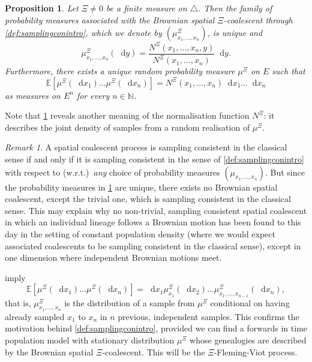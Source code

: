 \documentclass[reqno,draft]{amsart}
\numberwithin{equation}{section}
\theoremstyle{plain}
\newtheorem{proposition}[theorem]{Proposition}
\theoremstyle{remark}
\newtheorem{remark}[theorem]{Remark}
\newcommand{\N}{\mathbb{N}} %
\newcommand{\E}{\mathbb{E}} %
\newcommand*\diff{\mathop{}\!\mathrm{d}}
\begin{document}
\begin{proposition}\label{prop:musamplingintro}
    Let $\Xi \neq 0$ be a finite measure on $\triangle$. Then the family of probability measures associated with the Brownian spatial $\Xi$-coalescent through \cref{def:samplingconintro}, which we denote by $(\mu^\Xi_{x_1, \ldots ,x_n})$, is unique and
    \begin{equation}\label{eq:muNintro}
        \mu^{\Xi}_{x_1, \ldots ,x_n}(\diff y) = \frac{N^\Xi(x_1,\ldots ,x_n,y)}{N^\Xi(x_1, \ldots ,x_n)} \diff y.
    \end{equation}
    Furthermore, there exists a unique random probability measure $\mu^\Xi$ on $E$ such that
    \begin{equation}\label{eq:Emuintro}
        \E\left[ \mu^\Xi(\diff x_1) \ldots \mu^\Xi(\diff x_n)\right] = N^\Xi(x_1, \ldots ,x_n) \diff x_1\ldots \diff x_n
    \end{equation}
    as measures on $E^n$ for every $n\in \N$.
\end{proposition}
Note that \cref{prop:musamplingintro} reveals another meaning of the normalisation function $N^\Xi$: it describes the joint density of samples from a random realisation of $\mu^\Xi$.

\begin{remark}
    A spatial coalescent process is sampling consistent in the classical sense if and only if it is sampling consistent in the sense of \cref{def:samplingconintro} with respect to (w.r.t.)\ \emph{any} choice of probability measures $(\mu_{x_1, \ldots ,x_n})$. But since the probability measures in \cref{prop:musamplingintro} are unique, there exists no Brownian spatial coalescent, except the trivial one, which is sampling consistent in the classical sense. This may explain why no non-trivial, sampling consistent spatial coalescent in which an individual lineage follows a Brownian motion has been found to this day in the setting of constant population density (where we would expect associated coalescents to be sampling consistent in the classical sense), except in one dimension where independent Brownian motions meet.
\end{remark}

 imply \[
    \E \left[ \mu^\Xi(\diff x_1)\ldots \mu^\Xi(\diff x_n) \right] =  \diff x_1 \mu^\Xi_{x_1}(\diff x_2) \ldots \mu^\Xi_{x_1, \ldots ,x_{n-1}}(\diff x_n),
\] that is, $\mu^\Xi_{x_1, \ldots ,x_n}$ is the distribution of a sample from $\mu^\Xi$ conditional on having already sampled $x_1$ to $x_n$ in $n$ previous, independent samples. This confirms the motivation behind \cref{def:samplingconintro}, provided we can find a forwards in time population model with stationary distribution $\mu^\Xi$ whose genealogies are described by the Brownian spatial $\Xi$-coalescent. This will be the $\Xi$-Fleming-Viot process.
\end{document}
